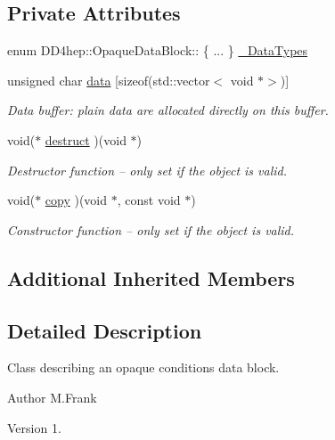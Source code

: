\subsection*{Private Attributes}
\begin{DoxyCompactItemize}
\item 
enum D\+D4hep\+::\+Opaque\+Data\+Block\+:: \{ ... \}  \hyperlink{class_d_d4hep_1_1_opaque_data_block_a0e431bafd05dde4afeba30aab68e8930}{\+\_\+\+Data\+Types}
\item 
unsigned char \hyperlink{class_d_d4hep_1_1_opaque_data_block_a200e53deafdc5f74aadd47e066357c04}{data} \mbox{[}sizeof(std\+::vector$<$ void $\ast$$>$)\mbox{]}
\begin{DoxyCompactList}\small\item\em Data buffer\+: plain data are allocated directly on this buffer. \end{DoxyCompactList}\item 
void($\ast$ \hyperlink{class_d_d4hep_1_1_opaque_data_block_a7480cd5ca3b040da44a7a902a2cf3bfd}{destruct} )(void $\ast$)
\begin{DoxyCompactList}\small\item\em Destructor function -- only set if the object is valid. \end{DoxyCompactList}\item 
void($\ast$ \hyperlink{class_d_d4hep_1_1_opaque_data_block_a824e5874b1243b34bf57fee30e09f524}{copy} )(void $\ast$, const void $\ast$)
\begin{DoxyCompactList}\small\item\em Constructor function -- only set if the object is valid. \end{DoxyCompactList}\end{DoxyCompactItemize}
\subsection*{Additional Inherited Members}


\subsection{Detailed Description}
Class describing an opaque conditions data block. 

\begin{DoxyAuthor}{Author}
M.\+Frank 
\end{DoxyAuthor}
\begin{DoxyVersion}{Version}
1. 
\end{DoxyVersion}


